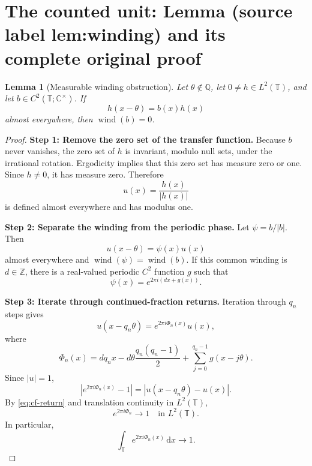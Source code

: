 \documentclass[10pt,a4paper]{amsart}
\newcommand{\C}{\mathbb{C}}
\newcommand{\Q}{\mathbb{Q}}
\newcommand{\T}{\mathbb{T}}
\newcommand{\Z}{\mathbb{Z}}
\newcommand{\dd}{\,\mathrm{d}}
\newcommand{\wind}{\operatorname{wind}}
\theoremstyle{plain}
\newtheorem{lemma}[theorem]{Lemma}
\theoremstyle{remark}
\begin{document}
\section{The counted unit: Lemma (source label lem:winding) and its complete original proof}

\begin{lemma}[Measurable winding obstruction]
\label{lem:winding}
Let \(\theta\notin\Q\), let \(0\neq h\in L^2(\T)\), and let
\(b\in C^2(\T;\C^\times)\). If
\begin{equation}
  h(x-\theta)=b(x)h(x)
  \label{eq:abstract-cocycle}
\end{equation}
almost everywhere, then \(\wind(b)=0\).
\end{lemma}

\begin{proof}
\textbf{Step 1: Remove the zero set of the transfer function.}
Because \(b\) never vanishes, the zero set of \(h\) is invariant, modulo null
sets, under the irrational rotation. Ergodicity implies that this zero set has
measure zero or one. Since \(h\neq0\), it has measure zero. Therefore
\[
  u(x)=\frac{h(x)}{|h(x)|}
\]
is defined almost everywhere and has modulus one.

\smallskip
\noindent
\textbf{Step 2: Separate the winding from the periodic phase.}
Let \(\psi=b/|b|\). Then
\[
  u(x-\theta)=\psi(x)u(x)
\]
almost everywhere and \(\wind(\psi)=\wind(b)\). If this common winding is
\(d\in\Z\), there is a real-valued periodic \(C^2\) function \(g\) such that
\[
  \psi(x)=e^{2\pi i(dx+g(x))}.
\]

\smallskip
\noindent
\textbf{Step 3: Iterate through continued-fraction returns.}
Iteration through \(q_n\) steps gives
\[
  u(x-q_n\theta)=e^{2\pi i\Phi_n(x)}u(x),
\]
where
\begin{equation}
  \Phi_n(x)
  =dq_nx-d\theta\frac{q_n(q_n-1)}2
   +\sum_{j=0}^{q_n-1}g(x-j\theta).
  \label{eq:Phi-def}
\end{equation}
Since \(|u|=1\),
\[
  |e^{2\pi i\Phi_n(x)}-1|
  =|u(x-q_n\theta)-u(x)|.
\]
By \eqref{eq:cf-return} and translation continuity in \(L^2(\T)\),
\begin{equation}
  e^{2\pi i\Phi_n}\longrightarrow1
  \quad\text{in }L^2(\T).
  \label{eq:phase-to-one}
\end{equation}
In particular,
\begin{equation}
  \int_\T e^{2\pi i\Phi_n(x)}\dd x\longrightarrow1.
  \label{eq:phase-integral-one}
\end{equation}


\end{proof}
\end{document}
